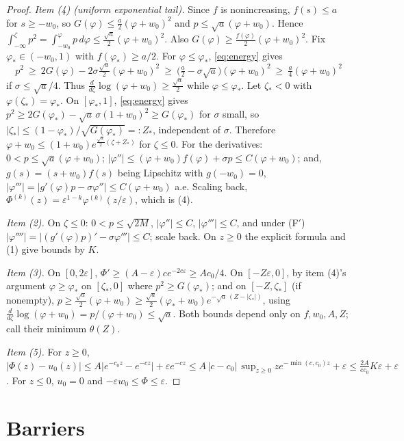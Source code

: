 \documentclass[11pt]{amsart}
\theoremstyle{remark}
\newcommand{\ve}{\varepsilon}
\begin{document}
\begin{proof}
\emph{Item (4) (uniform exponential tail).} Since $f$ is nonincreasing,
$f(s)\le a$ for $s\ge-w_0$, so $G(\varphi)\le\frac a2(\varphi+w_0)^2$ and
$p\le\sqrt a(\varphi+w_0)$. Hence
$\int_{-\infty}^\zeta p^2=\int_{-w_0}^{\varphi}p\,d\varphi\le\frac{\sqrt a}{2}(\varphi+w_0)^2$.
Also $G(\varphi)\ge\frac{f(\varphi)}2(\varphi+w_0)^2$. Fix $\varphi_*\in(-w_0,1)$
with $f(\varphi_*)\ge a/2$. For $\varphi\le\varphi_*$, \eqref{eq:energy} gives
\[
p^2\ \ge\ 2G(\varphi)-2\sigma\tfrac{\sqrt a}{2}(\varphi+w_0)^2\ \ge\
\big(\tfrac a2-\sigma\sqrt a\big)(\varphi+w_0)^2\ \ge\ \tfrac a4(\varphi+w_0)^2
\]
if $\sigma\le\sqrt a/4$. Thus $\frac{d}{d\zeta}\log(\varphi+w_0)\ge\frac{\sqrt a}2$
while $\varphi\le\varphi_*$. Let $\zeta_*<0$ with $\varphi(\zeta_*)=\varphi_*$. On
$[\varphi_*,1]$, \eqref{eq:energy} gives
$p^2\ge2G(\varphi_*)-\sqrt a\,\sigma(1+w_0)^2\ge G(\varphi_*)$ for $\sigma$
small, so $|\zeta_*|\le(1-\varphi_*)/\sqrt{G(\varphi_*)}=:Z_*$, independent of
$\sigma$. Therefore $\varphi+w_0\le(1+w_0)e^{\frac{\sqrt a}{2}(\zeta+Z_*)}$ for
$\zeta\le0$. For the derivatives: $0<p\le\sqrt a(\varphi+w_0)$;
$|\varphi''|\le(\varphi+w_0)f(\varphi)+\sigma p\le C(\varphi+w_0)$; and, $g(s)=(s+w_0)f(s)$
being Lipschitz with $g(-w_0)=0$,
$|\varphi'''|=|g'(\varphi)p-\sigma\varphi''|\le C(\varphi+w_0)$ a.e. Scaling back,
$\Phi^{(k)}(z)=\ve^{1-k}\varphi^{(k)}(z/\ve)$, which is (4).

\emph{Item (2).} On $\zeta\le0$: $0<p\le\sqrt{2M}$, $|\varphi''|\le C$,
$|\varphi'''|\le C$, and under (F$'$) $|\varphi''''|=|(g'(\varphi)p)'-\sigma\varphi'''|\le C$;
scale back. On $z\ge0$ the explicit formula and (1) give bounds by $K$.

\emph{Item (3).} On $[0,2\ve]$, $\Phi'\ge(A-\ve)ce^{-2c\ve}\ge Ac_0/4$. On
$[-Z\ve,0]$, by item (4)'s argument $\varphi\ge\varphi_*$ on $[\zeta_*,0]$
where $p^2\ge G(\varphi_*)$; and on $[-Z,\zeta_*]$ (if nonempty),
$p\ge\frac{\sqrt a}2(\varphi+w_0)\ge\frac{\sqrt a}2(\varphi_*+w_0)e^{-\sqrt a\,(Z-|\zeta_*|)}$,
using $\frac{d}{d\zeta}\log(\varphi+w_0)=p/(\varphi+w_0)\le\sqrt a$. Both bounds depend
only on $f,w_0,A,Z$; call their minimum $\theta(Z)$.

\emph{Item (5).} For $z\ge0$,
$|\Phi(z)-u_0(z)|\le A|e^{-c_0z}-e^{-cz}|+\ve e^{-cz}\le A\,|c-c_0|\,\sup_{z\ge0}ze^{-\min(c,c_0)z}+\ve
\le\frac{2A}{ec_0}K\ve+\ve$. For $z\le0$, $u_0=0$ and $-\ve w_0\le\Phi\le\ve$.
\end{proof}

\section{Barriers}
\end{document}
